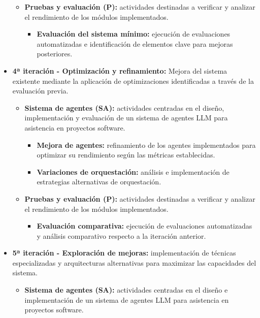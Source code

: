 \begin{itemize}
\begin{itemize}
\begin{itemize}
        \end{itemize}
      \item\textbf{Pruebas y evaluación (P):} actividades destinadas a verificar y analizar el rendimiento de los módulos implementados.
        \begin{itemize}
          \item\textbf{Evaluación del sistema mínimo: } ejecución de evaluaciones automatizadas e identificación de elementos clave para mejoras posteriores.
        \end{itemize}
    \end{itemize}
  \item\textbf{4ª iteración - Optimización y refinamiento: }Mejora del sistema existente mediante la aplicación de optimizaciones identificadas a través de la evaluación previa.
    \begin{itemize}
      \item\textbf{Sistema de agentes (SA):} actividades centradas en el diseño, implementación y evaluación de un sistema de agentes LLM para asistencia en proyectos software.
        \begin{itemize}
          \item\textbf{Mejora de agentes:} refinamiento de los agentes implementados para optimizar su rendimiento según las métricas establecidas.
          \item\textbf{Variaciones de orquestación:} análisis e implementación de estrategias alternativas de orquestación. 
        \end{itemize}
      \item\textbf{Pruebas y evaluación (P):} actividades destinadas a verificar y analizar el rendimiento de los módulos implementados.
        \begin{itemize}
          \item\textbf{Evaluación comparativa:} ejecución de evaluaciones automatizadas y análisis comparativo respecto a la iteración anterior.
        \end{itemize}
    \end{itemize}
\item\textbf{5ª iteración - Exploración de mejoras: }implementación de técnicas especializadas y arquitecturas alternativas para maximizar las capacidades del sistema.
    \begin{itemize}
      \item\textbf{Sistema de agentes (SA):} actividades centradas en el diseño e implementación de un sistema de agentes LLM para asistencia en proyectos software.

\end{itemize}
\end{itemize}
